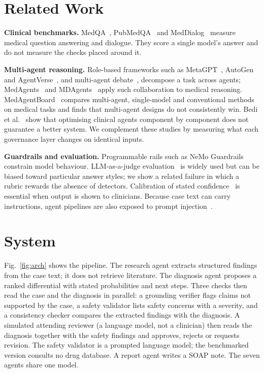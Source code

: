 \documentclass[conference]{IEEEtran}
\begin{document}
\section{Related Work}
\textbf{Clinical benchmarks.} MedQA~\cite{jin2021medqa}, PubMedQA~\cite{jin2019pubmedqa} and
MedDialog~\cite{zeng2020meddialog} measure medical question answering and dialogue. They score a single model's
answer and do not measure the checks placed around it.

\textbf{Multi-agent reasoning.} Role-based frameworks such as MetaGPT~\cite{hong2023metagpt},
AutoGen~\cite{wu2023autogen} and AgentVerse~\cite{chen2023agentverse}, and multi-agent debate~\cite{du2023improving},
decompose a task across agents; MedAgents~\cite{tang2024medagents} and MDAgents~\cite{kim2024mdagents} apply
such collaboration to medical reasoning. MedAgentBoard~\cite{zhu2025medagentboard} compares multi-agent, single-model and
conventional methods on medical tasks and finds that multi-agent designs do not consistently win. Bedi et
al.~\cite{bedi2025optimization} show that optimising clinical agents component by component does not guarantee a
better system. We complement these studies by measuring what each governance layer changes on identical inputs.

\textbf{Guardrails and evaluation.} Programmable rails such as NeMo Guardrails~\cite{rebedea2023nemo} constrain
model behaviour. LLM-as-a-judge evaluation~\cite{zheng2023judging} is widely used but can be biased toward particular
answer styles; we show a related failure in which a rubric rewards the absence of detectors. Calibration of stated
confidence~\cite{guo2017calibration} is essential when output is shown to clinicians. Because case text can carry
instructions, agent pipelines are also exposed to prompt injection~\cite{greshake2023indirect}.

\section{System}
Fig.~\ref{fig:arch} shows the pipeline. The research agent extracts structured findings from the case text; it
does not retrieve literature. The diagnosis agent proposes a ranked differential with stated probabilities and next
steps. Three checks then read the case and the diagnosis in parallel: a grounding verifier flags claims not supported
by the case, a safety validator lists safety concerns with a severity, and a consistency checker compares the
extracted findings with the diagnosis. A simulated attending reviewer (a language model, not a clinician) then reads
the diagnosis together with the safety findings and approves, rejects or requests revision. The safety
validator is a prompted language model; the benchmarked version consults no drug database. A report agent writes a
SOAP note. The seven agents share one model.
\end{document}
